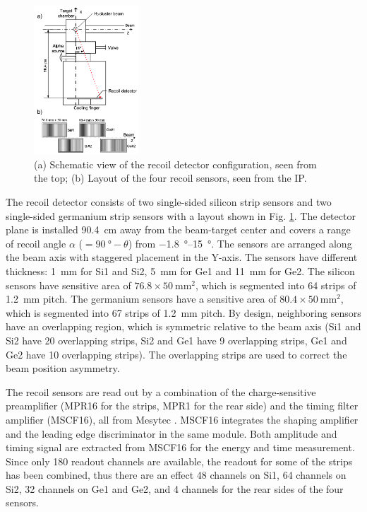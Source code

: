 \documentclass[number,5p]{elsarticle}
\begin{document}
\begin{figure}[htbp]
  \centering
  \includegraphics[width=0.35\textwidth]{./recoil_schematic.png}
  \caption{(a) Schematic view of the recoil detector configuration, seen from the
    top; (b) Layout of the four recoil sensors, seen from the IP.}
  \label{fig:recoil_schematic}
\end{figure}

The recoil detector consists of two single-sided silicon strip sensors and two
single-sided germanium strip sensors with a layout shown in Fig. \ref{fig:recoil_schematic}.
The detector plane is installed \SI{90.4}{\cm} away from the beam-target center
and covers a range of recoil angle $\alpha$ ($=\SI{90}{\degree}-\theta$) from \SIrange[range-units=repeat]{-1.8}{15}{\degree}.
The sensors are arranged along the beam axis with staggered placement in the Y-axis.
The sensors have different thickness: \SI{1}{\mm} for Si1
and Si2, \SI{5}{\mm} for Ge1 and \SI{11}{\mm} for Ge2.
The silicon sensors have sensitive area of $76.8 \times \SI{50}{\mm\squared}$, which is
segmented into 64 strips of \SI{1.2}{\mm} pitch.
The germanium sensors have a sensitive area of \(80.4 \times \SI{50}{\mm\squared}\), which is segmented into 67 strips of \SI{1.2}{\mm} pitch.
By design, neighboring sensors have an overlapping region, which is symmetric
relative to the beam axis (Si1 and Si2 have 20 overlapping strips, Si2 and Ge1
have 9 overlapping strips, Ge1 and Ge2 have 10 overlapping strips).
The overlapping strips are used to correct the beam position asymmetry.

The recoil sensors are read out by a combination of the charge-sensitive preamplifier (MPR16 for the strips, MPR1 for the rear side) 
and the timing filter amplifier (MSCF16), all from Mesytec \cite{mesytec}. 
MSCF16 integrates the shaping amplifier and the leading edge discriminator in the same module.
Both amplitude and timing signal are extracted from MSCF16 for the energy and time measurement.
Since only 180 readout channels are available, the readout for some of the
strips has been combined, thus there are an effect 48 channels on Si1, 64
channels on Si2, 32 channels on Ge1 and Ge2, and 4 channels for the rear sides
of the four sensors. 
\end{document}
